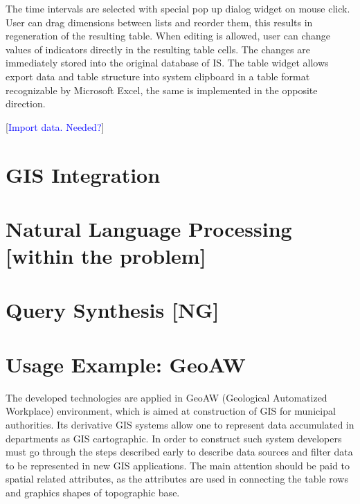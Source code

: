 \documentclass[conference]{IEEEtran}
\newcommand{\e}[2][fcolor]{\textcolor{pcolor}{[}\textcolor{#1}{#2}\textcolor{pcolor}{]}}
\begin{document}
The time intervals are selected with special pop up dialog widget on mouse click.  User can drag dimensions between lists and reorder them, this results in regeneration of the resulting table.  When editing is allowed, user can change values of indicators directly in the resulting table cells.  The changes are immediately stored into the original database of IS.  The table widget allows export data and table structure into system clipboard in a table format recognizable by Microsoft Excel, the same is implemented in the opposite direction.

\e[blue]{Import data. Needed?}





\section{GIS Integration}
\label{sec:gis-integration}



\section{Natural Language Processing [within the problem]}
\label{sec:natur-lang-proc}

\section{Query Synthesis [NG]}
\label{sec:query-synthesis-ng}

\section{Usage Example: GeoAW}
\label{sec:usage-gis}

The developed technologies are applied in GeoAW (Geological Automatized Workplace) environment, which is aimed at construction of GIS for municipal authorities.  Its derivative GIS systems allow one to represent data accumulated in departments as GIS cartographic.  In order to construct such system developers must go through the steps described early to describe data sources and filter data to be represented in new GIS applications.  The main attention should be paid to spatial related attributes, as the attributes are used in connecting the table rows and graphics shapes of topographic base.
\end{document}
